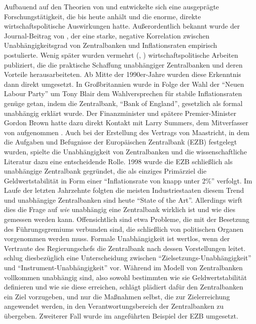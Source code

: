 Aufbauend auf den Theorien von \textcite{Alesina1987} und \textcite{Rogoff1985} entwickelte sich eine ausgeprägte Forschungstätigkeit, die bis heute anhält und die enorme, direkte wirtschaftspolitische Auswirkungen hatte. Außerordentlich bekannt wurde der Journal-Beitrag von \textcite{Alesina1993}, der eine starke, negative Korrelation zwischen Unabhängigkeitsgrad von Zentralbanken und Inflationsraten empirisch postulierte. Wenig später wurden vermehrt (\textcite{Goodhart1994a}, \textcite{Goodhart1994b}) wirtschaftspolitische Arbeiten publiziert, die die praktische Schaffung unabhängiger Zentralbanken und deren Vorteile herausarbeiteten. Ab Mitte der 1990er-Jahre wurden diese Erkenntnis dann direkt umgesetzt. In Großbritannien wurde in Folge der Wahl der "`Neuen Labour Party"' um Tony Blair dem Wahlversprechen für stabile Inflationsraten genüge getan, indem die Zentralbank, "`Bank of England"', gesetzlich als formal unabhängig erklärt wurde. Der Finanzminister und spätere Premier-Minister Gordon Brown hatte dazu direkt Kontakt mit Larry Summers, dem Mitverfasser von \textcite{Alesina1993} aufgenommen \parencite[S. 549]{Snowdon2005}. Auch bei der Erstellung des Vertrags von Maastricht, in dem die Aufgaben und Befugnisse der Europäischen Zentralbank (EZB) festgelegt wurden, spielte die Unabhängigkeit von Zentralbanken und die wissenschaftliche Literatur dazu eine entscheidende Rolle. 1998 wurde die EZB schließlich als unabhängige Zentralbank gegründet, die als einziges Primärziel die Geldwertstabilität in Form einer "`Inflationsrate von knapp unter 2\%"' verfolgt. Im Laufe der letzten Jahrzehnte folgten die meisten Industriestaaten diesem Trend und unabhängige Zentralbanken sind heute "`State of the Art"'. Allerdings wirft dies die Frage auf \textit{wie} unabhängig eine Zentralbank wirklich ist und wie dies gemessen werden kann. Offensichtlich sind etwa Probleme, die mit der Besetzung des Führungsgremiums verbunden sind, die schließlich von politischen Organen vorgenommen werden muss. Formale Unabhängigkeit ist wertlos, wenn der Vertraute des Regierungschefs die Zentralbank nach dessen Vorstellungen leitet. \textcite{Fischer1995} schlug diesbezüglich eine Unterscheidung zwischen "`Zielsetzungs-Unabhängigkeit"' und "`Instrument-Unabhängigkeit"' vor. Während im Modell von \textcite{Rogoff1985} Zentralbanken vollkommen unabhängig sind, also sowohl bestimmten wie sie Geldwertstabilität definieren und wie sie diese erreichen, schlägt plädiert \textcite{Fischer1995} dafür den Zentralbanken ein Ziel vorzugeben, und nur die Maßnahmen selbst, die zur Zielerreichung angewendet werden, in den Verantwortungsbereich der Zentralbanken zu übergeben. Zweiterer Fall wurde im angeführten Beispiel der EZB umgesetzt.

